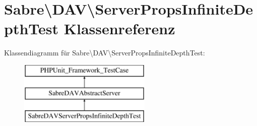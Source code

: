 \hypertarget{class_sabre_1_1_d_a_v_1_1_server_props_infinite_depth_test}{}\section{Sabre\textbackslash{}D\+AV\textbackslash{}Server\+Props\+Infinite\+Depth\+Test Klassenreferenz}
\label{class_sabre_1_1_d_a_v_1_1_server_props_infinite_depth_test}
Klassendiagramm für Sabre\textbackslash{}D\+AV\textbackslash{}Server\+Props\+Infinite\+Depth\+Test\+:\begin{figure}[H]
\begin{center}
\leavevmode
\includegraphics[height=3.000000cm]{class_sabre_1_1_d_a_v_1_1_server_props_infinite_depth_test}
\end{center}
\end{figure}
